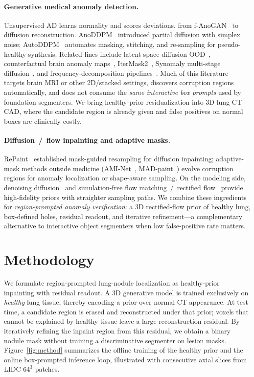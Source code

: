 \documentclass[letterpaper]{article} %
\begin{document}
\paragraph{Generative medical anomaly detection.}
Unsupervised AD learns normality and scores deviations, from
f-AnoGAN~\citep{fanogan2019} to diffusion reconstruction.
AnoDDPM~\citep{anoddpm2022} introduced partial diffusion with simplex
noise; AutoDDPM~\citep{autoddpm2023} automates masking, stitching, and
re-sampling for pseudo-healthy synthesis.
Related lines include latent-space diffusion
OOD~\citep{latent_ad2023}, counterfactual brain anomaly
maps~\citep{fontanella2023}, IterMask2~\citep{itermask2024},
Synomaly multi-stage diffusion~\citep{synomaly2024}, and
frequency-decomposition pipelines~\citep{fdp2026}.
Much of this literature targets brain MRI or other 2D/stacked settings,
discovers corruption regions automatically, and does not consume the
\emph{same interactive box prompts} used by foundation segmenters.
We bring healthy-prior residualization into 3D lung CT CAD, where the
candidate region is already given and false positives on normal boxes
are clinically costly.

\paragraph{Diffusion~/~flow inpainting and adaptive masks.}
RePaint~\citep{lugmayr2022repaint} established mask-guided resampling
for diffusion inpainting; adaptive-mask methods outside medicine
(AMI-Net~\citep{aminet2024}, MAD-paint~\citep{madpaint2025}) evolve
corruption regions for anomaly localization or shape-aware sampling.
On the modeling side, denoising diffusion~\citep{ho2020ddpm} and
simulation-free flow matching~/~rectified
flow~\citep{lipman2023flowmatching,liu2023flow} provide high-fidelity
priors with straighter sampling paths.
We combine these ingredients for \emph{region-prompted anomaly
verification}: a 3D rectified-flow prior of healthy lung, box-defined
holes, residual readout, and iterative refinement---a complementary
alternative to interactive object segmenters when low false-positive
rate matters.

\section{Methodology}
\label{sec:method}

We formulate region-prompted lung-nodule localization as healthy-prior
inpainting with residual readout.
A 3D generative model is trained exclusively on \emph{healthy} lung tissue,
thereby encoding a prior over normal CT appearance.
At test time, a candidate region is erased and reconstructed under that prior;
voxels that cannot be explained by healthy tissue leave a large reconstruction
residual.
By iteratively refining the inpaint region from this residual, we obtain a
binary nodule mask without training a discriminative segmenter on lesion masks.
Figure~\ref{fig:method} summarizes the offline training of the healthy prior
and the online box-prompted inference loop, illustrated with consecutive
axial slices from LIDC \(64^{3}\) patches.
\end{document}

